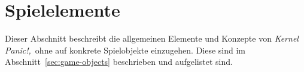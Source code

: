 \section{Spielelemente}

Dieser Abschnitt beschreibt die allgemeinen Elemente und Konzepte von
\emph{Kernel Panic!,} ohne auf konkrete Spielobjekte einzugehen. Diese sind im
Abschnitt~\ref{sec:game-objects} beschrieben und aufgelistet sind.














